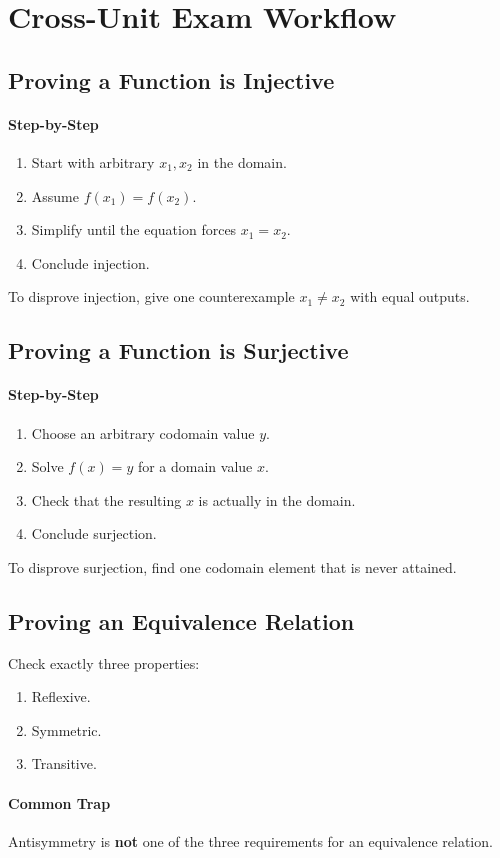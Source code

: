 \documentclass[12pt]{article}
\newcommand{\Step}{\paragraph{Step-by-Step}}
\newcommand{\Warning}{\paragraph{Common Trap}}
\begin{document}
\newpage
\section{Cross-Unit Exam Workflow}

\subsection{Proving a Function is Injective}
\Step
\begin{enumerate}
    \item Start with arbitrary $x_1,x_2$ in the domain.
    \item Assume $f(x_1)=f(x_2)$.
    \item Simplify until the equation forces $x_1=x_2$.
    \item Conclude injection.
\end{enumerate}
To disprove injection, give one counterexample $x_1\ne x_2$ with equal outputs.

\subsection{Proving a Function is Surjective}
\Step
\begin{enumerate}
    \item Choose an arbitrary codomain value $y$.
    \item Solve $f(x)=y$ for a domain value $x$.
    \item Check that the resulting $x$ is actually in the domain.
    \item Conclude surjection.
\end{enumerate}
To disprove surjection, find one codomain element that is never attained.

\subsection{Proving an Equivalence Relation}
Check exactly three properties:
\begin{enumerate}
    \item Reflexive.
    \item Symmetric.
    \item Transitive.
\end{enumerate}
\Warning Antisymmetry is \textbf{not} one of the three requirements for an equivalence relation.
\end{document}
